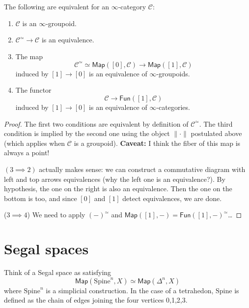 \begin{lemma}
\label{lemma-equivalences-for-infty-groupoids}
The following are equivalent for an $\infty$-category $\mathcal{C}$:
\begin{enumerate}
\item $\mathcal{C}$ is an $\infty$-groupoid.

\item $\mathcal{C}^\simeq \to \mathcal{C}$ is an equivalence.

\item The map
$$
\mathcal{C}^\simeq \simeq \mathsf{Map}([0],\mathcal{C})
\to \mathsf{Map}([1],\mathcal{C})
$$
induced by $[1] \to [0]$ is an equivalence
of $\infty$-groupoids.

\item The functor
$$
\mathcal{C}\to \mathsf{Fun}([1],\mathcal{C})
$$
induced by $[1]\to [0]$ is an equivalence
of $\infty$-categories.
\end{enumerate}
\end{lemma}

\begin{proof}
The first two conditions are equivalent by definition
of $\mathcal{C}^{\simeq}$. The third condition is implied
by the second one using the object $\|\cdot\|$ postulated above
(which applies when $\mathcal{C}$ is a groupoid).
{\bf Caveat:} I think the fiber of this map is always a point!

$(3\implies 2)$ actually makes sense:
we can construct a commutative diagram with left and top arrows
equivalences (why the left one is an equivalence?).
By hypothesis, the one on the right is also an equivalence.
Then the one on the bottom is too, and since $[0]$ and $[1]$ 
detect equivalences, we are done.

($3 \implies 4$) We need to apply $(-)^\simeq$ and
$\mathsf{Map}([1],-)=\mathsf{Fun}([1],-)^\simeq$…
\end{proof}

\section{Segal spaces}
\label{section-segal}


\begin{remark}
\label{remark-Segal-spaces}
Think of a Segal space as satisfying
$$
\mathsf{Map}(\text{Spine}^n,X) \simeq \mathsf{Map}(\Delta^n,X)
$$
where $\text{Spine}^n$ is a simplicial construction. 
In the case of a tetrahedon, $\text{Spine}$ is defined as the
chain of edges joining the four vertices 0,1,2,3.
\end{remark}


